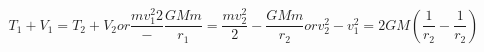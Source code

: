 \begin{equation*}
T_{1} + V_{1} = T_{2} + V_{2} or \frac{mv_{1}^{2}{2}} - \frac{GMm}{r_{1}} = \frac{mv_{2}^{2}}{2} - \frac{GMm}{r_{2}} or v_{2}^{2} - v_{1}^{2} = 2GM\left(\frac{1}{r_{2}} - \frac{1}{r_{2}}\right) \tag{4.15}
\end{equation*}
